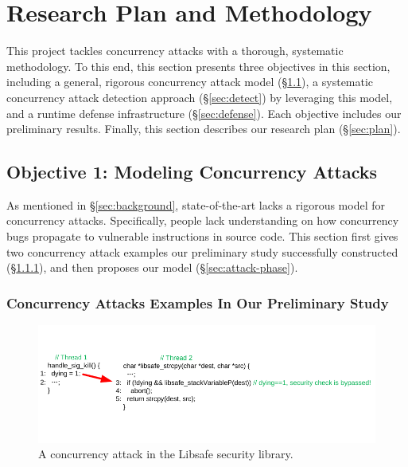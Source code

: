 \section{Research Plan and Methodology} \label{sec:rep}

This \xxx project tackles concurrency attacks with a thorough, systematic 
methodology. To this end, this section presents three objectives in this section, including 
a general, rigorous concurrency attack model (\S\ref{sec:model}), 
a systematic concurrency attack detection approach 
(\S\ref{sec:detect}) by leveraging this model, and a runtime defense 
infrastructure (\S\ref{sec:defense}). Each objective includes our preliminary results. 
Finally, this section describes our research plan (\S\ref{sec:plan}).

\vspace{-.15in}\subsection{Objective 1: Modeling Concurrency Attacks} 
\label{sec:model}\vspace{-.075in}

As mentioned in \S\ref{sec:background}, state-of-the-art lacks a rigorous model 
for concurrency attacks. Specifically, people lack understanding on how 
concurrency bugs propagate to vulnerable instructions in source code. This 
section first gives two concurrency attack examples our preliminary study 
successfully constructed (\S\ref{sec:examples}), and then proposes 
our model (\S\ref{sec:attack-phase}).

\vspace{-.15in}\subsubsection{Concurrency Attacks Examples In Our Preliminary Study} 
\label{sec:examples}\vspace{-.075in}

\begin{figure}[h]
\centering
\includegraphics[width=0.8\columnwidth]{figures/libsafe}
\vspace{-.05in}
\caption{{A concurrency attack in the Libsafe security library.}} \label{fig:libsafe}
\vspace{-.15in}
\end{figure}

